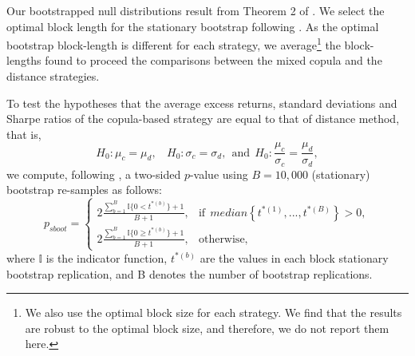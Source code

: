 
Our bootstrapped null distributions result from Theorem 2 of \citet*{pr94}. We select the optimal block length for the stationary bootstrap following \citet*{pw04}. As the optimal bootstrap block-length is different for each strategy, we average\footnote{We also use the optimal block size for each strategy. We find that the results are robust to the optimal block size, and therefore, we do not report them here.} the block-lengths found to proceed the comparisons between the mixed copula and the distance strategies.

To test the hypotheses that the average excess returns, standard deviations and Sharpe ratios of the copula-based strategy are equal to that of distance method, that is,
\begin{equation}
H_{0}:\mu_{c}=\mu_{d},  \ \
\ \  H_{0}:\sigma_{c}=\sigma_{d},
\ \ \textrm{and} \ \ H_{0}:\frac{\mu_{c}}{\sigma_{c}}=\frac{\mu_{d}}{\sigma_{d}},
\label{eq:eq153}
\end{equation}
we compute, following \citet*{davison1997}, a two-sided $p$-value using $B=10,000$ (stationary) bootstrap re-samples as follows:
\begin{equation}
p_{sboot}=
\begin{cases}
2\frac{\sum_{b=1}^{B}\mathbb{I}\{0< t^{\ast(b)}\}+1}{B+1}, &\text{if} ~~median\left\{ t^{\ast \left( 1\right) },...,t^{\ast \left( B\right)}\right\} > 0, \\
2\frac{\sum_{b=1}^{B}\mathbb{I}\{0\geq t^{\ast(b)}\}+1}{B+1}, &\text{otherwise},
\end{cases}
\label{eq:eq152}
\end{equation}
where $\mathbb{I}$ is the indicator function, $t^{\ast(b)}$ are the values in each block stationary bootstrap replication, and B denotes the number of bootstrap replications.



